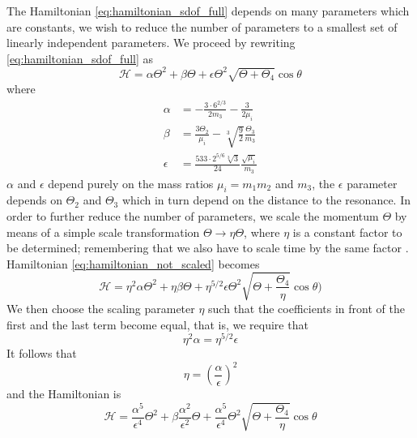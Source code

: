 \documentclass[ twoside,openright,titlepage,numbers=noenddot,headinclude,%
                footinclude=true,cleardoublepage=empty,abstractoff, %
                BCOR=5mm,paper=a4,fontsize=11pt,%
                american,%
                ]{scrreprt}
\begin{document}
The Hamiltonian \ref{eq:hamiltonian_sdof_full} depends on many parameters
which are constants, we wish to reduce the number of parameters to a 
smallest set of linearly independent parameters. We proceed by rewriting
\cref{eq:hamiltonian_sdof_full} as
\begin{equation}
    \mathcal{H}=\alpha\Theta^2+\beta\Theta +\epsilon\Theta^2\sqrt{\Theta+\Theta_4}
    \cos\theta
    \label{eq:hamiltonian_not_scaled}
\end{equation}
where
\begin{equation}
    \begin{aligned}
        \alpha&= - \frac{3\cdot 6^{2/3}}{2m_3} - \frac{3}{2\mu_i}\\
        \beta&=\frac{3\Theta_2 }{\mu_i}
          -\sqrt[3]{\frac{9}{2}}\frac{\Theta_3}{m_3} \\
         \epsilon&=\frac{533\cdot 2^{5/6}\sqrt[3]{3}}{24} 
        \frac{\sqrt{\mu_i}}{m_3}    
    \end{aligned}
\end{equation}
$\alpha$ and $\epsilon$ depend purely on the mass ratios $\mu_i=m_1m_2$ and
$m_3$, the $\epsilon$ parameter depends on $\Theta_2$ and $\Theta_3$ which in
turn depend on the distance to the resonance. In order to further reduce the 
number of parameters, we scale the momentum $\Theta$ by means of a 
simple scale transformation $\Theta\rightarrow\eta\Theta$, where
$\eta$ is a constant factor to be determined;
remembering that we also have to scale time by the same factor
. Hamiltonian \ref{eq:hamiltonian_not_scaled} becomes
\begin{equation}
    \mathcal{H}=\eta^2\alpha\Theta^2+\eta\beta\Theta +
    \eta^{5/2}\epsilon\Theta^2\sqrt{\Theta+ \frac{\Theta_4}{\eta}}
    \cos\theta)
\end{equation}
We then choose the scaling parameter $\eta$ such that the coefficients
in front of the first and the last term become equal, that is,
we require that 
\begin{equation}
    \eta^2\alpha=\eta^{5/2}\epsilon
\end{equation}
It follows that 
\begin{equation}
    \eta=\left( \frac{\alpha}{\epsilon} \right)^2
\end{equation}
and the Hamiltonian is
  \begin{equation}
    \mathcal{H}= \frac{\alpha^5}{\epsilon^4} \Theta^2+
      \beta \frac{\alpha^2}{\epsilon^2} \Theta +
    \frac{\alpha^5}{\epsilon^4} \Theta^2\sqrt{\Theta+ \frac{\Theta_4}{\eta}}
    \cos\theta
\end{equation}
\end{document}
